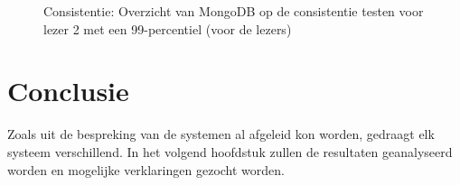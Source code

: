 \begin{figure}[ht!]
	\caption{Consistentie: Overzicht van MongoDB op de consistentie testen voor lezer 2 met een 99-percentiel (voor de lezers)}
	\label{fig:consistentie-mongodb-R2}
\end{figure}

\section{Conclusie}
Zoals uit de bespreking van de systemen al afgeleid kon worden, gedraagt elk systeem verschillend. In het volgend hoofdstuk zullen de resultaten geanalyseerd worden en mogelijke verklaringen gezocht worden. 
